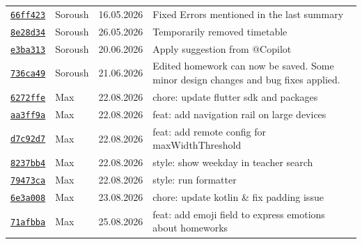 \documentclass{article}%
\begin{document}
\begin{longtable}{l l l p{12cm}}
\href{https://github.com/scriptor1000/homeworks/pull/21/commits/66ff4230aa9ecd79b8f02f02d578748b7fbae122}{\underline{\texttt{66ff423}}}&Soroush&16.05.2026&Fixed Errors mentioned in the last summary\\%
\href{https://github.com/scriptor1000/homeworks/pull/21/commits/8e28d347e3912a3a0213d3ffde37c2639289934f}{\underline{\texttt{8e28d34}}}&Soroush&26.05.2026&Temporarily removed timetable\\%
\href{https://github.com/scriptor1000/homeworks/pull/21/commits/e3ba31360cb430456e024368922cb8475047e13d}{\underline{\texttt{e3ba313}}}&Soroush&20.06.2026&Apply suggestion from @Copilot\\%
\href{https://github.com/scriptor1000/homeworks/pull/21/commits/736ca49500f2e693e9076e534db01f31cf5c290c}{\underline{\texttt{736ca49}}}&Soroush&21.06.2026&Edited homework can now be saved. Some minor design changes and bug fixes applied.\\%
\href{https://github.com/scriptor1000/homeworks/pull/21/commits/6272ffe668f22a505a3d79c46080b95a0dbbd3a8}{\underline{\texttt{6272ffe}}}&Max&22.08.2026&chore: update flutter sdk and packages\\%
\href{https://github.com/scriptor1000/homeworks/pull/21/commits/aa3ff9a04f945a262fcab306946d7563ebd064d2}{\underline{\texttt{aa3ff9a}}}&Max&22.08.2026&feat: add navigation rail on large devices\\%
\href{https://github.com/scriptor1000/homeworks/pull/21/commits/d7c92d7e02f5112c1a3f714e6d56aa3d69de502f}{\underline{\texttt{d7c92d7}}}&Max&22.08.2026&feat: add remote config for maxWidthThreshold\\%
\href{https://github.com/scriptor1000/homeworks/pull/21/commits/8237bb49a9307bb6cd69381f8288397cf98fc448}{\underline{\texttt{8237bb4}}}&Max&22.08.2026&style: show weekday in teacher search\\%
\href{https://github.com/scriptor1000/homeworks/pull/21/commits/79473ca5fe63fae271dbd272cd19396c1651b1d4}{\underline{\texttt{79473ca}}}&Max&22.08.2026&style: run formatter\\%
\href{https://github.com/scriptor1000/homeworks/pull/21/commits/6e3a008ce71c7db4e08de22a2f015271d012997a}{\underline{\texttt{6e3a008}}}&Max&23.08.2026&chore: update kotlin \& fix padding issue\\%
\href{https://github.com/scriptor1000/homeworks/pull/21/commits/71afbbaa3fb6b0e3b7514a703415dc71e652bdae}{\underline{\texttt{71afbba}}}&Max&25.08.2026&feat: add emoji field to express emotions about homeworks\\%

\end{longtable}
\end{document}
